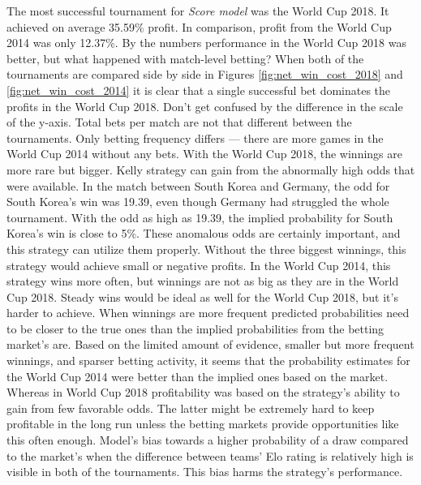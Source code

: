 The most successful tournament for \textit{Score model} was the World Cup 2018. It achieved on average 35.59\% profit. In comparison, profit from the World Cup 2014 was only 12.37\%. By the numbers performance in the World Cup 2018 was better, but what happened with match-level betting? When both of the tournaments are compared side by side in Figures \ref{fig:net_win_cost_2018} and \ref{fig:net_win_cost_2014} it is clear that a single successful bet dominates the profits in the World Cup 2018. Don't get confused by the difference in the scale of the y-axis. Total bets per match are not that different between the tournaments. Only betting frequency differs --- there are more games in the World Cup 2014 without any bets. With the World Cup 2018, the winnings are more rare but bigger. Kelly strategy can gain from the abnormally high odds that were available. In the match between South Korea and Germany, the odd for South Korea's win was 19.39, even though Germany had struggled the whole tournament. With the odd as high as 19.39, the implied probability for South Korea's win is close to 5\%. These anomalous odds are certainly important, and this strategy can utilize them properly. Without the three biggest winnings, this strategy would achieve small or negative profits. In the World Cup 2014, this strategy wins more often, but winnings are not as big as they are in the World Cup 2018. Steady wins would be ideal as well for the World Cup 2018, but it's harder to achieve. When winnings are more frequent predicted probabilities need to be closer to the true ones than the implied probabilities from the betting market's are. Based on the limited amount of evidence, smaller but more frequent winnings, and sparser betting activity, it seems that the probability estimates for the World Cup 2014 were better than the implied ones based on the market. Whereas in World Cup 2018 profitability was based on the strategy's ability to gain from few favorable odds. The latter might be extremely hard to keep profitable in the long run unless the betting markets provide opportunities like this often enough. Model's bias towards a higher probability of a draw compared to the market's when the difference between teams' Elo rating is relatively high is visible in both of the tournaments. This bias harms the strategy's performance.


